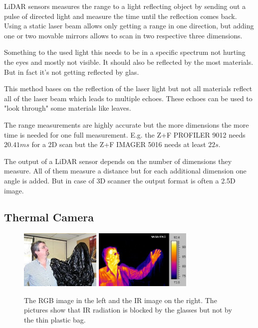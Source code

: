 \ac{LiDAR} sensors measures the range to a light reflecting object by sending out a pulse of directed light and measure the time until the reflection comes back.
Using a static laser beam allows only getting a range in one direction, but adding one or two movable mirrors allows to scan in two respective three dimensions. 

Something to the used light this needs to be in a specific spectrum not hurting the eyes and mostly not visible.
It should also be reflected by the most materials.
But in fact it's not getting reflected by glas.


This method bases on the reflection of the laser light but not all materials reflect all of the laser beam which leads to multiple echoes.
These echoes can be used to "look through" some materials like leaves. 

The range measurements are highly accurate but the more dimensions the more time is needed for one full measurement.
E.g. the Z+F PROFILER\circledR{} 9012\cite{z+fLaserProfiler} needs $20.41\si{ms}$ for a 2D scan but the Z+F IMAGER\circledR{} 5016 needs at least $22\si{s}$.

The output of a \ac{LiDAR} sensor depends on the number of dimensions they measure.
All of them measure a distance but for each additional dimension one angle is added.
But in case of 3D scanner the output format is often a 2.5D image.

\subsection{Thermal Camera}\label{ssec:thermalCamera}

\begin{figure}
	\centering
	\includegraphics[height=2.8cm]{img/fundamentals/Human-Visible.jpg}
	\includegraphics[height=2.8cm]{img/fundamentals/Human-Infrared.jpg}

	\caption{The RGB image in the left and the IR image on the right. The pictures show that IR radiation is blocked by the glasses but not by the thin plastic bag.}
	\label{fig:humanIRVIS}
\end{figure}

